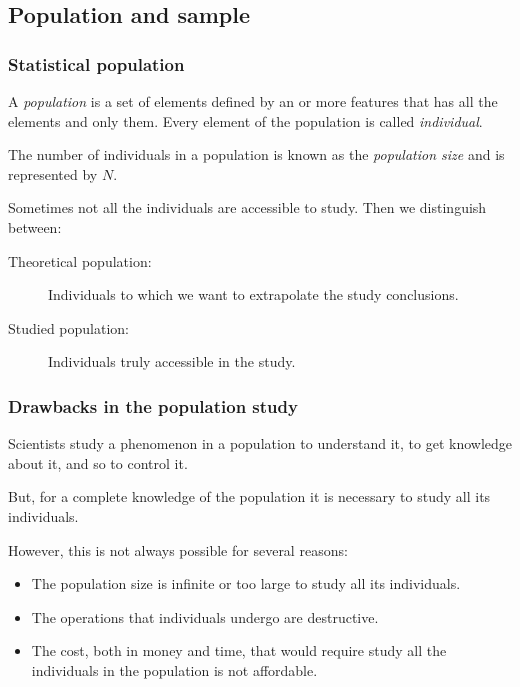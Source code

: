 \subsection{Population and sample}
\begin{frame}
\frametitle{Statistical population}
\begin{definition}[Population]
A \emph{population} is a set of elements defined by an or more features that has all the elements and only them.
Every element of the population is called \emph{individual}.
\end{definition}

\begin{definition}
The number of individuals in a population is known as the \emph{population size} and is represented by $N$.
\end{definition}

Sometimes not all the individuals are accessible to study.
Then we distinguish between:
\begin{description}
\item [Theoretical population:] Individuals to which we want to extrapolate the study conclusions.
\item [Studied population:] Individuals truly accessible in the study.
\end{description}
\end{frame}


\begin{frame}
\frametitle{Drawbacks in the population study}
Scientists study a phenomenon in a population to understand it, to get knowledge about it, and so to control it.

But, for a complete knowledge of the population it is necessary to study all its individuals.

However, this is not always possible for several reasons:
\begin{itemize}
\item The population size is infinite or too large to study all its individuals.
\item The operations that individuals undergo are destructive.
\item The cost, both in money and time, that would require study all the individuals in the population is not affordable.
\end{itemize}
\end{frame}


